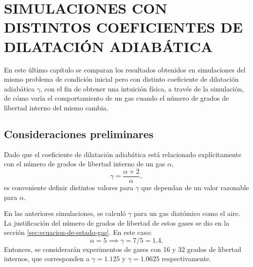 \chapter{SIMULACIONES CON DISTINTOS COEFICIENTES DE DILATACIÓN ADIABÁTICA}
\label{cap:5}
En este último capítulo se comparan los resultados obtenidos en simulaciones del mismo problema de condición inicial pero con distinto coeficiente de dilatación adiabática $\gamma$, con el fin de obtener una intuición física, a través de la simulación, de cómo varía el comportamiento de un gas cuando el número de grados de libertad interno del mismo cambia.
\section{Consideraciones preliminares}
Dado que el coeficiente de dilatación adiabática está relacionado explícitamente con el número de grados de libertad interno de un gas $\alpha$,
\begin{equation}
	\gamma = \frac{\alpha + 2}{\alpha},
\end{equation}
es conveniente definir distintos valores para $\gamma$ que dependan de un valor razonable para $\alpha$.

En las anteriores simulaciones, se calculó $\gamma$ para un gas diatómico como el aire. La justificación del número de grados de libertad de estos gases se dio en la sección \ref{sec:ecuacion-de-estado-gas}. En este caso:
\begin{equation}
	\alpha = 5 \implies \gamma = 7/5 = 1.4.
\end{equation}
Entonces, se considerarán experimentos de gases con 16 y 32 grados de libertad internos, que corresponden a $\gamma=1.125$ y $\gamma=1.0625$ respectivamente.
